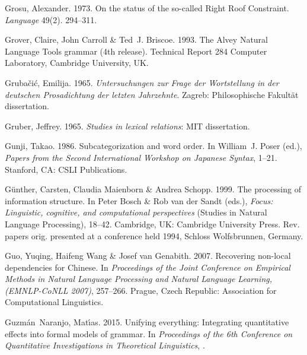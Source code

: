 \begin{thebibliography}{1420}
Grosu, Alexander. 1973.
\newblock On the status of the so-called {Right Roof Constraint}.
\newblock \emph{Language} 49(2). 294--311.

Grover, Claire, John Carroll \& Ted~J. Briscoe. 1993.
\newblock The {Alvey Natural Language Tools} grammar (4th release).
\newblock Technical Report 284 Computer Laboratory, Cambridge University, UK.

Gruba\v{c}i\'c, Emilija. 1965.
\newblock \emph{{Untersuchungen zur Frage der Wortstellung in der deutschen
  Prosadichtung der letzten Jahrzehnte}}.
\newblock Zagreb: Philosophische Fakult{\"a}t dissertation.

Gruber, Jeffrey. 1965.
\newblock \emph{Studies in lexical relations}: MIT dissertation.

Gunji, Takao. 1986.
\newblock Subcategorization and word order.
\newblock In William~J. Poser (ed.), \emph{Papers from the {Second
  International Workshop on Japanese Syntax}}, 1--21. Stanford, CA: CSLI
  Publications.

G{\"u}nther, Carsten, Claudia Maienborn \& Andrea Schopp. 1999.
\newblock The processing of information structure.
\newblock In Peter Bosch \& Rob {van der Sandt} (eds.), \emph{Focus:
  {Linguistic}, cognitive, and computational perspectives}  (Studies in Natural
  Language Processing), 18--42. Cambridge, UK: Cambridge University Press.
\newblock Rev. papers orig. presented at a conference held 1994, Schloss
  Wolfsbrunnen, Germany.

Guo, Yuqing, Haifeng Wang \& Josef van Genabith. 2007.
\newblock Recovering non-local dependencies for {Chinese}.
\newblock In \emph{Proceedings of the {Joint Conference on Empirical Methods in
  Natural Language Processing and Natural Language Learning, (EMNLP-CoNLL
  2007)}}, 257--266. Prague, Czech Republic: Association for Computational
  Linguistics.

Guzm{\'a}n~Naranjo, Mat{\'\i}as. 2015.
\newblock Unifying everything: {Integrating} quantitative effects into formal
  models of grammar.
\newblock In \emph{Proceedings of the 6th {Conference on Quantitative
  Investigations in Theoretical Linguistics}}, .


\end{thebibliography}
